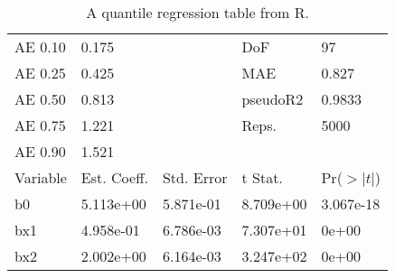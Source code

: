 \begin{table}[h!]
\caption[Quantile regression table all from R]{A quantile regression table from R.}\label{qreg}\begin{center}
\begin{tabular}{l l l l l}

\hline
AE 0.10	&	0.175	&		&	DoF	&	97\\ 
AE 0.25	&	0.425	&		&	MAE	&	0.827\\ 
AE 0.50	&	0.813	&		&	pseudoR2	&	0.9833\\ 
AE 0.75	&	1.221	&		&	Reps.	&	5000\\ 
AE 0.90	&	1.521	&		&		&	\\ 
\hline
Variable	&	Est. Coeff.	&	Std. Error	&	t Stat.	&	Pr($>|t|$)\\ 
\hline
b0	&	5.113e+00	&	5.871e-01	&	8.709e+00	&	3.067e-18\\ 
bx1	&	4.958e-01	&	6.786e-03	&	7.307e+01	&	0e+00\\ 
bx2	&	2.002e+00	&	6.164e-03	&	3.247e+02	&	0e+00\\ 
\hline\end{tabular}
\end{center}
\end{table}